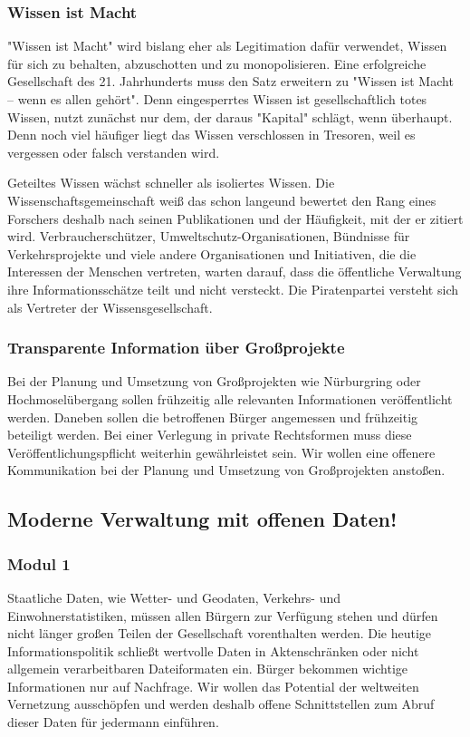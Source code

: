 \subsubsection{Wissen ist Macht}
\abstimmung
"Wissen ist Macht" wird bislang eher als Legitimation dafür verwendet, Wissen für sich zu behalten, abzuschotten und zu monopolisieren. Eine erfolgreiche Gesellschaft des 21. Jahrhunderts muss den Satz erweitern zu "Wissen ist Macht – wenn es allen gehört". Denn eingesperrtes Wissen ist gesellschaftlich totes Wissen, nutzt zunächst nur dem, der daraus "Kapital" schlägt, wenn überhaupt. Denn noch viel häufiger liegt das Wissen verschlossen in Tresoren, weil es vergessen oder falsch verstanden wird.

Geteiltes Wissen wächst schneller als isoliertes Wissen. Die Wissenschaftsgemeinschaft weiß das schon langeund bewertet den Rang eines Forschers deshalb nach seinen Publikationen und der Häufigkeit, mit der er zitiert wird. Verbraucherschützer, Umweltschutz-Organisationen, Bündnisse für Verkehrsprojekte und viele andere Organisationen und Initiativen, die die Interessen der Menschen vertreten, warten darauf, dass die öffentliche Verwaltung ihre Informationsschätze teilt und nicht versteckt. Die Piratenpartei versteht sich als Vertreter der Wissensgesellschaft.
 
\subsubsection{Transparente Information über Großprojekte}
\abstimmung
Bei der Planung und Umsetzung von Großprojekten wie Nürburgring oder Hochmoselübergang sollen frühzeitig alle relevanten Informationen veröffentlicht werden. Daneben sollen die betroffenen Bürger angemessen und frühzeitig beteiligt werden. Bei einer Verlegung in private Rechtsformen muss diese Veröffentlichungspflicht weiterhin gewährleistet sein. Wir wollen eine offenere Kommunikation bei der Planung und Umsetzung von Großprojekten anstoßen.
 
\subsection*{Moderne Verwaltung mit offenen Daten!}
\subsubsection{Modul 1}
\abstimmung
Staatliche Daten, wie Wetter- und Geodaten, Verkehrs- und Einwohnerstatistiken, müssen allen Bürgern zur Verfügung stehen und dürfen nicht länger großen Teilen der Gesellschaft vorenthalten werden. Die heutige Informationspolitik schließt wertvolle Daten in Aktenschränken oder nicht allgemein verarbeitbaren Dateiformaten ein. Bürger bekommen wichtige Informationen nur auf Nachfrage. Wir wollen das Potential der weltweiten Vernetzung ausschöpfen und werden deshalb offene Schnittstellen zum Abruf dieser Daten für jedermann einführen.

